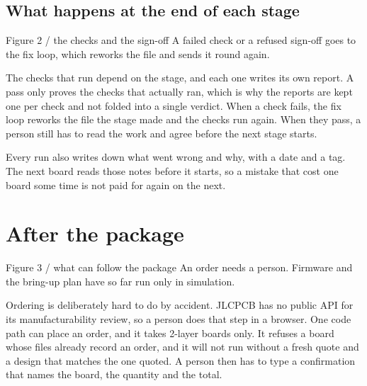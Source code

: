 \documentclass[11pt]{article}
\begin{document}
\newpage

\subsection{What happens at the end of each stage}

\begin{hsfigure}{Figure 2 / the checks and the sign-off}%
{A failed check or a refused sign-off goes to the fix loop, which reworks the
file and sends it round again.}
\end{hsfigure}

The checks that run depend on the stage, and each one writes its own report. A
pass only proves the checks that actually ran, which is why the reports are
kept one per check and not folded into a single verdict. When a check fails,
the fix loop reworks the file the stage made and the checks run again. When
they pass, a person still has to read the work and agree before the next stage
starts.

Every run also writes down what went wrong and why, with a date and a tag. The
next board reads those notes before it starts, so a mistake that cost one
board some time is not paid for again on the next.

\newpage

\section{After the package}

\begin{hsfigure}{Figure 3 / what can follow the package}%
{An order needs a person. Firmware and the bring-up plan have so far run only
in simulation.}
\end{hsfigure}

Ordering is deliberately hard to do by accident. JLCPCB has no public API for
its manufacturability review, so a person does that step in a browser. One
code path can place an order, and it takes 2-layer boards only. It refuses a
board whose files already record an order, and it will not run without a fresh
quote and a design that matches the one quoted. A person then has to type a
confirmation that names the board, the quantity and the total.
\end{document}
